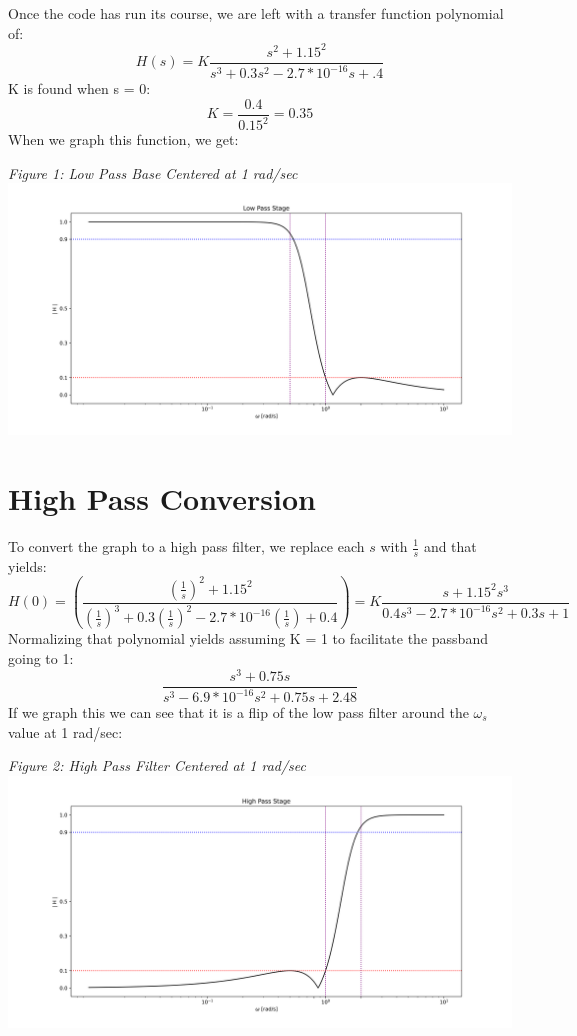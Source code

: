 \documentclass[12pt,a4paper]{article}
\begin{document}
	Once the code has run its course, we are left with a transfer function polynomial of:
	$$H(s) = K\frac{s^2+1.15^2}{s^3+0.3s^2-2.7*10^{-16}s+.4}$$
	K is found when s = 0:
	$$K = \frac{0.4}{0.15^2}=0.35$$
	When we graph this function, we get: 
	\begin{center}
		\textit{Figure 1: Low Pass Base Centered at 1 rad/sec}
		\includegraphics[width = 7in]{Figure_1.png}
	\end{center}
	\section*{High Pass Conversion}
	To convert the graph to a high pass filter, we replace each $s$ with $\frac{1}{s}$ and that yields: 
	$$H(0)=\left(\frac{\left(\frac{1}{s}\right)^2+1.15^2}{\left(\frac{1}{s}\right)^3 + 0.3\left(\frac{1}{s}\right)^2-2.7*10^{-16}\left(\frac{1}{s}\right)+0.4}\right)=K\frac{s+1.15^2s^3}{0.4s^3-2.7*10^{-16}s^2+0.3s+1}$$
	Normalizing that polynomial yields assuming K = 1 to facilitate the passband going to 1: 
	$$\frac{s^3+0.75s}{s^3-6.9*10^{-16}s^2+0.75s+2.48}$$
	If we graph this we can see that it is a flip of the low pass filter around the $\omega_s$ value at 1 rad/sec:
		\begin{center}
		\textit{Figure 2: High Pass Filter Centered at 1 rad/sec }
		\includegraphics[width = 7in]{Figure_2.png}
	\end{center}
\end{document}
